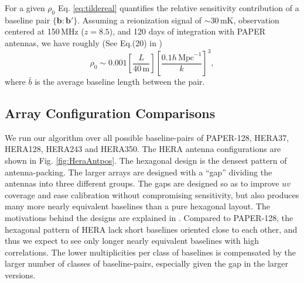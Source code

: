 \documentclass[twocolumn,apj,numberedappendix]{emulateapj}
\renewcommand\[{\begin{equation}}
\renewcommand\]{\end{equation}}
\begin{document}
For a given $\rho_0$ Eq. \eqref{eq:tildereal} quantifies the relative sensitivity contribution of a baseline pair $\{\boldsymbol{b}:\boldsymbol{b'}\}$. Assuming a reionization signal of $\sim 30\,\text{mK}$, observation centered at 150\,MHz ($z=8.5$), and 120 days of integration with PAPER antennas, we have roughly
(See Eq.(20) in \cite{first-paper})
\begin{equation}
\rho_0 \sim 0.001\left[\frac{L}{40\,\text{m}}\right] \left[\frac{0.1h\,\text{Mpc}^{-1}}{k}\right]^3, 
\end{equation}
where $\bar{b}$ is the average baseline length between the pair.  

\subsection{Array Configuration Comparisons \label{sec:arrconf}}
We run our algorithm over all possible baseline-pairs of  PAPER-128, HERA37, HERA128, HERA243 and HERA350. The HERA antenna configurations are shown in Fig. \ref{fig:HeraAntpos}. The  
hexagonal design is the densest pattern of antenna-packing. The larger arrays are designed with a ``gap'' dividing the antennas into three different groups. The gaps are designed so as to improve $uv$ coverage and ease calibration without compromising sensitivity, but also produces many more nearly equivalent baselines than a pure hexagonal layout. The motivations behind the designs are explained in \cite{HERAconfiguration}.  Compared to PAPER-128, the hexagonal pattern of HERA lack short baselines oriented close to each other, and thus we expect to see only longer nearly equivalent baselines with high correlations. The lower multiplicities per class of baselines is compensated by the larger number of classes of baseline-pairs, especially given the gap in the larger versions. 
\end{document}
